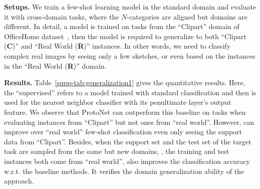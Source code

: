 \par\noindent\textbf{Setups.} We train a few-shot learning model in the standard domain and evaluate it with cross-domain tasks, where the $N$-categories are aligned but domains are different. In detail, a model is trained on tasks from the ``Clipart'' domain of OfficeHome dataset~\cite{Venkateswara2017Office}, then the model is required to generalize to both ``Clipart (\textbf{C})'' and ``Real World (\textbf{R})'' instances. In other words, we need to classify complex real images by seeing only a few sketches, or even based on the instances in the ``Real World (\textbf{R})'' domain. 

\par\noindent\textbf{Results.} Table~\ref{supp-tab:generalization1} gives the quantitative results. Here, the ``supervised'' refers to a model trained with standard classification and then is used for the nearest neighbor classifier with its penultimate layer's output feature. We observe that {ProtoNet} can outperform this baseline on tasks when evaluating instances from ``Clipart'' but not ones from ``real world''. However, \feat can improve over ``real world'' few-shot classification even only seeing the support data from ``Clipart''. Besides, when the support set and the test set of the target task are sampled from the same but new domains, \eg, the training and test instances both come from ``real world'', {\feat} also improves the classification accuracy w.r.t. the baseline methods. It verifies the domain generalization ability of the {\feat} approach. 

